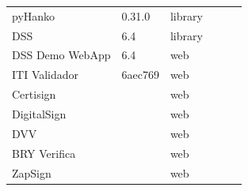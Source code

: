 \documentclass[12pt]{article}
\begin{document}
\begin{table}[ht]
\begin{tabular}{@{}lllccc@{}}
		pyHanko                                                     & 0.31.0           & library           &                                &                                & \Circle\hspace{4pt}\CIRCLE \\
		DSS                                                         & 6.4              & library           &                                &                                & \CIRCLE\hspace{4pt}\Circle \\
		DSS Demo WebApp                                             & 6.4              & web               & \LEFTcircle\hspace{4pt}\Circle & \LEFTcircle\hspace{4pt}\Circle &                            \\
		ITI Validador                                               & 6aec769          & web               & \CIRCLE\hspace{4pt}\Circle     & \CIRCLE\hspace{4pt}\Circle     &                            \\
		Certisign                                                   &                  & web               & \CIRCLE\hspace{4pt}\CIRCLE     & \CIRCLE\hspace{4pt}\CIRCLE     &                            \\
		DigitalSign                                                 &                  & web               & \CIRCLE\hspace{4pt}\Circle     & \CIRCLE\hspace{4pt}\Circle     &                            \\
		DVV                                                         &                  & web               & \LEFTcircle\hspace{4pt}\Circle & \LEFTcircle\hspace{4pt}\Circle &                            \\
		BRY Verifica                                                &                  & web               & \CIRCLE\hspace{4pt}\LEFTcircle & \CIRCLE\hspace{4pt}\LEFTcircle &                            \\
		ZapSign                                                     &                  & web               & \Circle\hspace{4pt}\Circle     & \Circle\hspace{4pt}\Circle     &                            \\

\end{tabular}
\end{table}
\end{document}
